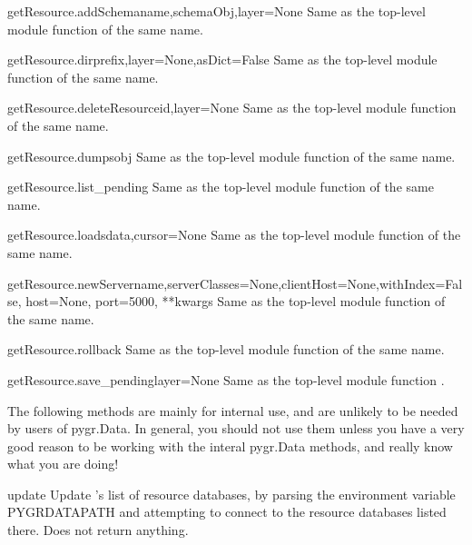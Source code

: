 \documentclass{howto}
\begin{document}
\begin{funcdesc}{getResource.addSchema}{name,schemaObj,layer=None}
  Same as the top-level module function of the same name.
\end{funcdesc}

\begin{funcdesc}{getResource.dir}{prefix,layer=None,asDict=False}
  Same as the top-level module function of the same name.
\end{funcdesc}

\begin{funcdesc}{getResource.deleteResource}{id,layer=None}
  Same as the top-level module function of the same name.
\end{funcdesc}

\begin{funcdesc}{getResource.dumps}{obj}
  Same as the top-level module function of the same name.
\end{funcdesc}

\begin{funcdesc}{getResource.list_pending}{}
  Same as the top-level module function of the same name.
\end{funcdesc}

\begin{funcdesc}{getResource.loads}{data,cursor=None}
  Same as the top-level module function of the same name.
\end{funcdesc}

\begin{funcdesc}{getResource.newServer}{name,serverClasses=None,clientHost=None,withIndex=False, host=None, port=5000, **kwargs}
  Same as the top-level module function of the same name.
\end{funcdesc}

\begin{funcdesc}{getResource.rollback}{}
  Same as the top-level module function of the same name.
\end{funcdesc}

\begin{funcdesc}{getResource.save_pending}{layer=None}
  Same as the top-level module function .
\end{funcdesc}

The following methods are mainly for internal use, and are unlikely to be
needed by users of pygr.Data.  In general, you should not use them unless
you have a very good reason to be working with the interal pygr.Data 
methods, and really know what you are doing!
\begin{funcdesc}{update}{}
  Update 's list of resource databases, by parsing the environment
  variable PYGRDATAPATH and attempting to connect to the resource databases
  listed there.  Does not return anything.
\end{funcdesc}
\end{document}
